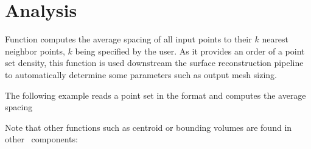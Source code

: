 \section{Analysis}

Function  computes the average spacing of all input points to their $k$ nearest neighbor points, $k$ being specified by the user. As it provides an order of a point set density, this function is used downstream the surface reconstruction pipeline to automatically determine some parameters such as output mesh sizing. \\

\ccExample

The following example reads a point set in the  format and computes the average spacing

Note that other functions such as centroid or bounding volumes are found in other \cgal\ components: \\
  \\
  \\
  \\

